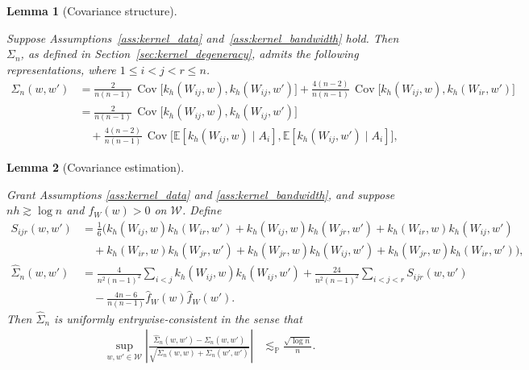 \documentclass[11pt,lof]{puthesis}
\renewcommand{\P}{\ensuremath{\mathbb{P}}}
\newcommand{\E}{\ensuremath{\mathbb{E}}}
\newcommand{\cW}{\ensuremath{\mathcal{W}}}
\DeclareMathOperator{\Cov}{Cov}
\theoremstyle{break}
\newtheorem{lemma}{Lemma}[section]
\theoremstyle{proof}
\begin{document}
\begin{lemma}[Covariance structure]
  \label{lem:kernel_app_covariance_structure}

  Suppose Assumptions~\ref{ass:kernel_data} and~\ref{ass:kernel_bandwidth}
  hold. Then $\Sigma_n$, as defined in Section~\ref{sec:kernel_degeneracy},
  admits the following representations,
  where $1 \leq i < j < r \leq n$.
  \begin{align*}
    \Sigma_n(w,w')
    &=
    \frac{2}{n(n-1)}
    \,\Cov\!\big[
      k_h(W_{i j},w),
      k_h(W_{i j},w')
    \big]
    +
    \frac{4(n-2)}{n(n-1)}
    \,\Cov\!\big[
      k_h(W_{i j},w),
      k_h(W_{i r},w')
    \big] \\
    &=
    \frac{2}{n(n-1)}
    \,\Cov\!\big[
      k_h(W_{i j},w),
      k_h(W_{i j},w')
    \big] \\
    &\quad+
    \frac{4(n-2)}{n(n-1)}
    \,\Cov\!\big[
      \E[k_h(W_{i j},w) \mid A_i],
      \E[k_h(W_{i j},w') \mid A_i]
    \big],
  \end{align*}
\end{lemma}

\begin{lemma}[Covariance estimation]
  \label{lem:kernel_app_covariance_estimation}

  Grant Assumptions \ref{ass:kernel_data} and \ref{ass:kernel_bandwidth},
  and suppose $n h \gtrsim \log n$ and $f_W(w) > 0$ on $\cW$. Define
  \begin{align*}
    S_{i j r}(w,w')
    &=
    \frac{1}{6}
    \Big(
      k_h(W_{i j},w)
      k_h(W_{i r},w')
      + k_h(W_{i j},w)
      k_h(W_{jr},w')
      + k_h(W_{i r},w)
      k_h(W_{i j},w') \\
      &\quad+
      k_h(W_{i r},w)
      k_h(W_{jr},w')
      + k_h(W_{jr},w)
      k_h(W_{i j},w')
      + k_h(W_{jr},w)
      k_h(W_{i r},w')
    \Big), \\
    \hat \Sigma_n(w,w')
    &=
    \frac{4}{n^2(n-1)^2}
    \sum_{i<j}
    k_h(W_{i j},w)
    k_h(W_{i j},w')
    +
    \frac{24}{n^2(n-1)^2}
    \sum_{i<j<r}
    S_{i j r}(w,w') \\
    &\quad-
    \frac{4n-6}{n(n-1)}
    \hat f_W(w)
    \hat f_W(w').
  \end{align*}
  Then $\hat \Sigma_n$
  is uniformly entrywise-consistent in the sense that
  \begin{align*}
    \sup_{w,w' \in \cW}
    \left|
    \frac{\hat \Sigma_n(w,w') - \Sigma_n(w,w')}
    {\sqrt{\Sigma_n(w,w) + \Sigma_n(w',w')}}
    \right|
    &\lesssim_\P
    \frac{\sqrt{\log n}}{n}.
  \end{align*}

\end{lemma}
\end{document}
